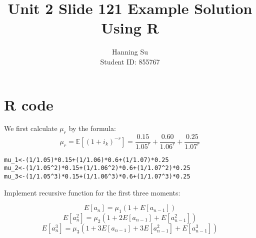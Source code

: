 \documentclass[]{article}\usepackage[]{graphicx}\usepackage[]{color}
\makeatletter
\newcommand{\hlnum}[1]{\textcolor[rgb]{0.686,0.059,0.569}{#1}}%
\newcommand{\hlopt}[1]{\textcolor[rgb]{0,0,0}{#1}}%
\newcommand{\hlstd}[1]{\textcolor[rgb]{0.345,0.345,0.345}{#1}}%
\newcommand{\hlkwb}[1]{\textcolor[rgb]{0.69,0.353,0.396}{#1}}%
\newenvironment{kframe}{%
 \def\at@end@of@kframe{}%
 \ifinner\ifhmode%
  \def\at@end@of@kframe{\end{minipage}}%
  \begin{minipage}{\columnwidth}%
 \fi\fi%
 \def\FrameCommand##1{\hskip\@totalleftmargin \hskip-\fboxsep
 \colorbox{shadecolor}{##1}\hskip-\fboxsep
     \hskip-\linewidth \hskip-\@totalleftmargin \hskip\columnwidth}%
 \MakeFramed {\advance\hsize-\width
   \@totalleftmargin\z@ \linewidth\hsize
   \@setminipage}}%
 {\par\unskip\endMakeFramed%
 \at@end@of@kframe}
\newenvironment{knitrout}{}{} %
\makeatother
\begin{document}
\title{\textbf {Unit 2 Slide 121 Example Solution Using R}}
\author{
		Hanning Su \\
        Student ID: 855767\\
}
\maketitle

\section*{R code}

We first calculate $\mu_r$ by the formula:
$$\mu_r=\mathbb{E}\left[\left(1+i_k\right)^{-r}\right]=\frac{0.15}{1.05^r}+\frac{0.60}{1.06^r}+\frac{0.25}{1.07^r}$$

\begin{knitrout}
\color{fgcolor}\begin{kframe}
\begin{alltt}
\hlstd{mu_1} \hlkwb{<-} \hlstd{(}\hlnum{1}\hlopt{/}\hlnum{1.05}\hlstd{)}\hlopt{*}\hlnum{0.15} \hlopt{+} \hlstd{(}\hlnum{1}\hlopt{/}\hlnum{1.06}\hlstd{)}\hlopt{*}\hlnum{0.6} \hlopt{+} \hlstd{(}\hlnum{1}\hlopt{/}\hlnum{1.07}\hlstd{)}\hlopt{*}\hlnum{0.25}
\hlstd{mu_2} \hlkwb{<-} \hlstd{(}\hlnum{1}\hlopt{/}\hlnum{1.05}\hlopt{^}\hlnum{2}\hlstd{)}\hlopt{*}\hlnum{0.15} \hlopt{+} \hlstd{(}\hlnum{1}\hlopt{/}\hlnum{1.06}\hlopt{^}\hlnum{2}\hlstd{)}\hlopt{*}\hlnum{0.6} \hlopt{+} \hlstd{(}\hlnum{1}\hlopt{/}\hlnum{1.07}\hlopt{^}\hlnum{2}\hlstd{)}\hlopt{*}\hlnum{0.25}
\hlstd{mu_3} \hlkwb{<-} \hlstd{(}\hlnum{1}\hlopt{/}\hlnum{1.05}\hlopt{^}\hlnum{3}\hlstd{)}\hlopt{*}\hlnum{0.15} \hlopt{+} \hlstd{(}\hlnum{1}\hlopt{/}\hlnum{1.06}\hlopt{^}\hlnum{3}\hlstd{)}\hlopt{*}\hlnum{0.6} \hlopt{+} \hlstd{(}\hlnum{1}\hlopt{/}\hlnum{1.07}\hlopt{^}\hlnum{3}\hlstd{)}\hlopt{*}\hlnum{0.25}
\end{alltt}
\end{kframe}
\end{knitrout}

Implement recursive function for the first three moments:

$$E\left[a_n\right]=\mu_1\left(1+E\left[a_{n-1}\right]\right)$$
$$E\left[a_n^2\right]=\mu_2\left(1+2E\left[a_{n-1}\right]+E\left[a_{n-1}^2\right]\right)$$
$$E\left[a_n^3\right]=\mu _3\left(1+3E\left[a_{n-1}\right]+3E\left[a_{n-1}^2\right]+E\left[a_{n-1}^3\right]\right)$$
\end{document}
